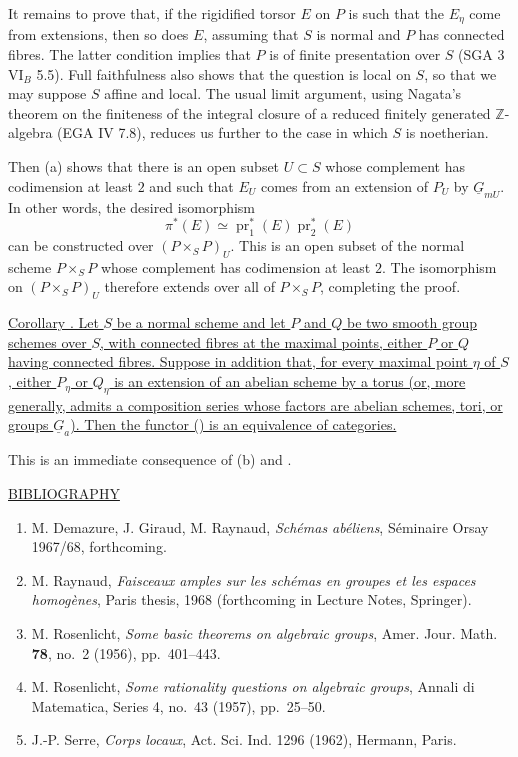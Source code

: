 It remains to prove that, if the rigidified torsor $E$ on $P$ is such that
the $E_\eta$ come from extensions, then so does $E$, assuming that $S$ is
normal and $P$ has connected fibres.  The latter condition implies that
$P$ is of finite presentation over $S$ (SGA 3 $\mathrm{VI}_B$ 5.5).
Full faithfulness also shows that the question is local on $S$, so that we
may suppose $S$ affine and local.  The usual limit argument, using
Nagata's theorem on the finiteness of the integral closure of a reduced
finitely generated $\mathbb Z$-algebra (EGA IV 7.8), reduces us further to
the case in which $S$ is noetherian.

Then (a) shows that there is an open subset $U\subset S$ whose complement
has codimension at least $2$ and such that $E_U$ comes from an extension of
$P_U$ by $\underline G_{mU}$.  In other words, the desired isomorphism
\[
 \pi^*(E)\simeq
 \operatorname{pr}_1^*(E)\operatorname{pr}_2^*(E)
\]
can be constructed over $(P\times_S P)_U$.  This is an open subset of the
normal scheme $P\times_S P$ whose complement has codimension at least $2$.
The isomorphism on $(P\times_S P)_U$ therefore extends over all of
$P\times_S P$, completing the proof.

\medskip
\noindent\underline{Corollary .  Let $S$ be a normal scheme and let $P$
and $Q$ be two smooth group schemes over $S$, with connected fibres at the
maximal points, either $P$ or $Q$ having connected fibres.  Suppose in
addition that, for every maximal point $\eta$ of $S$, either $P_\eta$ or
$Q_\eta$ is an extension of an abelian scheme by a torus (or, more
generally, admits a composition series whose factors are abelian schemes,
tori, or groups $\underline G_a$).  Then the functor () is an
equivalence of categories.}

This is an immediate consequence of (b) and .

\bigskip
\noindent\underline{BIBLIOGRAPHY}

\begin{enumerate}
\item[{[1]}] M. Demazure, J. Giraud, M. Raynaud,
  \emph{Sch\'emas ab\'eliens}, S\'eminaire Orsay 1967/68, forthcoming.
\item[{[2]}] M. Raynaud, \emph{Faisceaux amples sur les sch\'emas en groupes
  et les espaces homog\`enes}, Paris thesis, 1968 (forthcoming in Lecture
  Notes, Springer).
\item[{[3]}] M. Rosenlicht, \emph{Some basic theorems on algebraic groups},
  Amer. Jour. Math. \textbf{78}, no.~2 (1956), pp.~401--443.
\item[{[3bis]}] M. Rosenlicht, \emph{Some rationality questions on algebraic
  groups}, Annali di Matematica, Series 4, no.~43 (1957), pp.~25--50.
\item[{[4]}] J.-P. Serre, \emph{Corps locaux}, Act. Sci. Ind. 1296 (1962),
  Hermann, Paris.
\end{enumerate}
